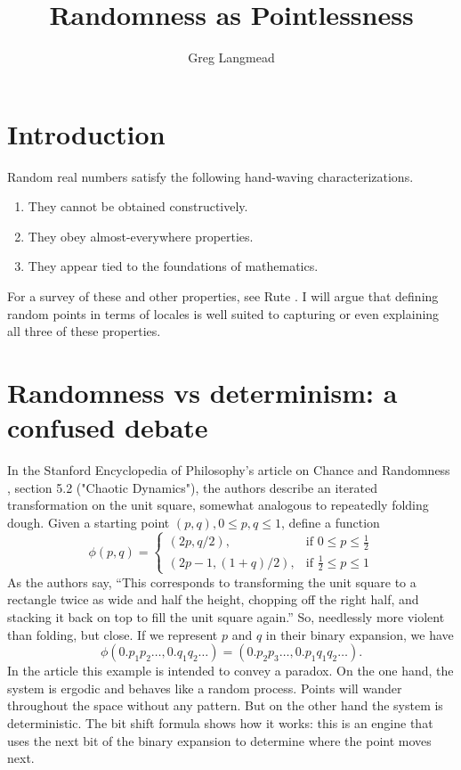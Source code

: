 \documentclass[12pt]{extarticle}
\title{Randomness as Pointlessness}
\author{Greg Langmead}
\begin{document}
\maketitle
\section{Introduction}
Random real numbers satisfy the following hand-waving characterizations.
\begin{enumerate}
\item They cannot be obtained constructively.
\item They obey almost-everywhere properties.
\item They appear tied to the foundations of mathematics.
\end{enumerate}
For a survey of these and other properties, see Rute \cite{rute}. I will argue that defining random points in terms of locales is well suited to capturing or even explaining all three of these properties.
\section{Randomness vs determinism: a confused debate}
In the Stanford Encyclopedia of Philosophy's article on Chance and Randomness \cite{sep-chance-randomness}, section 5.2 ("Chaotic Dynamics"), the authors describe an iterated transformation on the unit square, somewhat analogous to repeatedly folding dough. Given a starting point $(p,q), 0\leq p, q\leq 1$, define a function
\[
\phi(p,q) =
 \begin{cases}
 (2p, q/2), & \text{if } 0 \le p \le \frac{1}{2} \\
 (2p-1,(1+q)/2), & \text{if } \frac{1}{2} \le p \le 1
 \end{cases}
 \]
As the authors say, ``This corresponds to transforming the unit square to a rectangle twice as wide and half the height, chopping off the right half, and stacking it back on top to fill the unit square again.'' So, needlessly more violent than folding, but close. If we represent $p$ and $q$ in their binary expansion, we have \[ \phi (0.p_1 p_2\ldots, 0.q_1 q_2\ldots) = (0.p_2 p_3\ldots , 0.p_1 q_1 q_2\ldots).\]
In the article this example is intended to convey a paradox. On the one hand, the system is ergodic and behaves like a random process. Points will wander throughout the space without any pattern. But on the other hand the system is deterministic. The bit shift formula shows how it works: this is an engine that uses the next bit of the binary expansion to determine where the point moves next.
\end{document}
